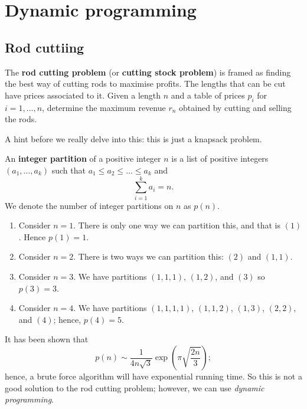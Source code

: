 \chapter{Dynamic programming}
\section{Rod cuttiing}

\begin{problem}
    The \textbf{rod cutting problem} (or \textbf{cutting stock problem}) is framed as finding the best way of cutting rods to maximise profits. 
    The lengths that can be cut have prices associated to it. 
    Given a length $n$ and a table of prices $p_i$ for $i = 1, \ldots, n$, 
    determine the maximum revenue $r_n$ obtained by cutting and selling the rods.
\end{problem}

\begin{remark}
    A hint before we really delve into this: this is just a knapsack problem.
\end{remark}

\begin{definition}
    An \textbf{integer partition} of a positive integer $n$ is a list of positive integers 
    $(a_1, \ldots, a_k)$ such that $a_1 \leq a_2 \leq \ldots \leq a_k$ and 
    \[ \sum_{i = 1}^k a_i = n. \]
    We denote the number of integer partitions on $n$ as $p(n)$.
\end{definition}

\begin{example}
    \begin{enumerate}
        \item Consider $n = 1$. 
            There is only one way we can partition this, and that is $(1)$. 
            Hence $p(1) = 1$.
        \item Consider $n = 2$. 
            There is two ways we can partition this: $(2)$ and $(1, 1)$.
        \item Consider $n = 3$. 
            We have partitions $(1, 1, 1)$, $(1, 2)$, and $(3)$ so $p(3) = 3$.
        \item Consider $n = 4$. 
            We have partitions $(1, 1, 1, 1)$, $(1, 1, 2)$, $(1, 3)$, $(2, 2)$, 
            and $(4)$; hence, $p(4) = 5$.
    \end{enumerate}
\end{example}

It has been shown that 
\[ p(n) \sim \frac{1}{4n\sqrt 3} \exp{\left(\pi \sqrt{\frac{2n}3}\right)}; \]
hence, a brute force algorithm will have exponential running time. 
So this is not a good solution to the rod cutting problem; 
however, we can use \emph{dynamic programming}.

